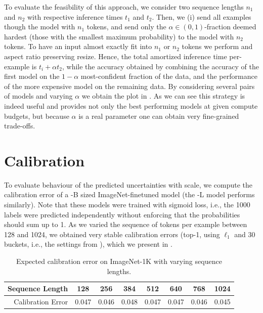 To evaluate the feasibility of this approach, we consider two sequence lengths $n_1$ and $n_2$ with respective inference times $t_1$ and $t_2$.
Then, we (i) send all examples though the model with $n_1$ tokens, and send only the $\alpha\in(0,1)$-fraction deemed hardest (those with the smallest maximum probability) to the model with $n_2$ tokens.
To have an input almost exactly fit into $n_1$ or $n_2$ tokens we perform and aspect ratio preserving resize.
Hence, the total amortized inference time per-example is $t_i + \alpha t_2$, while the accuracy obtained by combining the accuracy of the first model on the $1-\alpha$ most-confident fraction of the data, and the performance of the more expensive model on the remaining data.
By considering several pairs of models and varying $\alpha$ we obtain the plot in .
As we can see this strategy is indeed useful and provides not only the best performing models at given compute budgets, but because $\alpha$ is a real parameter one can obtain very fine-grained trade-offs.

\section{Calibration}
\label{app:calibration}

To evaluate behaviour of the predicted uncertainties with scale, we compute the calibration error of a -B sized ImageNet-finetuned model (the -L model performs similarly).
Note that these models were trained with sigmoid loss, i.e., the 1000 labels were predicted independently without enforcing that the probabilities should sum up to 1.
As we varied the sequence of tokens per example between 128 and 1024, we obtained very stable calibration errors (top-1, using $\ell_1$ and $30$ buckets, i.e., the settings from \cite{nixon2019measuring}), which we present in .

\begin{table}[h]
\centering
\caption{Expected calibration error on ImageNet-1K with varying sequence lengths.}
\label{tbl:calibration}
\begin{tabular}{r | c c c c c c c}
\toprule
Sequence Length & 128 & 256 & 384 & 512 & 640 & 768 & 1024 \\
\midrule
Calibration Error & 0.047 & 0.046 & 0.048 & 0.047 & 0.047 & 0.046 & 0.045 \\
\bottomrule
\end{tabular}

\end{table}


